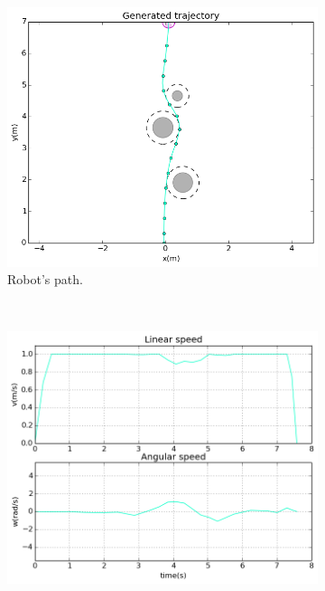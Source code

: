 \begin{figure}[!h]
        \centering
        ~ %
        \begin{subfigure}[b]{0.48\textwidth}
                \includegraphics[width=\textwidth]{./images/realtime/sim_results/p_3_0.48_2.4_11_4_0.001_15_40_20_5.0_0.1_3.0_0.5_1.0_10.0/multirobot-path.png}
                \caption{Robot's path.}\label{fig:rpath}
        \end{subfigure}
        ~ %
        \begin{subfigure}[b]{0.48\textwidth}
		\includegraphics[width=\textwidth]{./images/realtime/sim_results/p_3_0.48_2.4_11_4_0.001_15_40_20_5.0_0.1_3.0_0.5_1.0_10.0/multirobot-vw.png}

\end{subfigure}
\end{figure}
